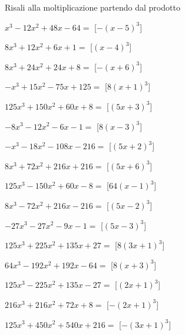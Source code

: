\begin{esercizio}
 \label{ese:11.11}
Risali alla moltiplicazione partendo dal prodotto

\begin{multicols}{2}
\begin{enumeratea}
\spazielenx
\item \(x^{3} - 12 x^{2} + 48 x - 64=\) 
\hfill [\(- \left(x - 5\right)^{3}\)]
\item \(8 x^{3} + 12 x^{2} + 6 x + 1=\) 
\hfill [\(\left(x - 4\right)^{3}\)]
\item \(8 x^{3} + 24 x^{2} + 24 x + 8=\) 
\hfill [\(- \left(x + 6\right)^{3}\)]
\item \(- x^{3} + 15 x^{2} - 75 x + 125=\) 
\hfill [\(8 \left(x + 1\right)^{3}\)]
\item \(125 x^{3} + 150 x^{2} + 60 x + 8=\) 
\hfill [\(\left(5 x + 3\right)^{3}\)]
\item \(- 8 x^{3} - 12 x^{2} - 6 x - 1=\) 
\hfill [\(8 \left(x - 3\right)^{3}\)]
\item \(- x^{3} - 18 x^{2} - 108 x - 216=\) 
\hfill [\(\left(5 x + 2\right)^{3}\)]
\item \(8 x^{3} + 72 x^{2} + 216 x + 216=\) 
\hfill [\(\left(5 x + 6\right)^{3}\)]
\item \(125 x^{3} - 150 x^{2} + 60 x - 8=\) 
\hfill [\(64 \left(x - 1\right)^{3}\)]
\item \(8 x^{3} - 72 x^{2} + 216 x - 216=\) 
\hfill [\(\left(5 x - 2\right)^{3}\)]
\item \(- 27 x^{3} - 27 x^{2} - 9 x - 1=\) 
\hfill [\(\left(5 x - 3\right)^{3}\)]
\item \(125 x^{3} + 225 x^{2} + 135 x + 27=\) 
\hfill [\(8 \left(3 x + 1\right)^{3}\)]
\item \(64 x^{3} - 192 x^{2} + 192 x - 64=\) 
\hfill [\(8 \left(x + 3\right)^{3}\)]
\item \(125 x^{3} - 225 x^{2} + 135 x - 27=\) 
\hfill [\(\left(2 x + 1\right)^{3}\)]
\item \(216 x^{3} + 216 x^{2} + 72 x + 8=\) 
\hfill [\(- \left(2 x + 1\right)^{3}\)]
\item \(125 x^{3} + 450 x^{2} + 540 x + 216=\) 
\hfill [\(- \left(3 x + 1\right)^{3}\)]

\end{enumeratea}
\end{multicols}
\end{esercizio}
